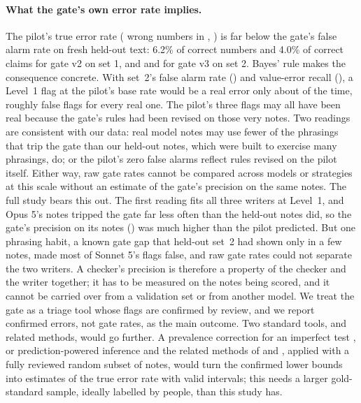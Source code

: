 \documentclass[11pt]{article}
\begin{document}
\paragraph{What the gate's own error rate implies.} The pilot's true error rate (\SoneUnsupN{} wrong numbers in \NChecked{}, \PilotBaseRate{}) is far below the gate's false alarm rate on fresh held-out text: 6.2\% of correct numbers and 4.0\% of correct claims for gate v2 on set 1, and \HeldTwoLoneFAPct{} and \HeldTwoLtwoFAPct{} for gate v3 on set 2. Bayes' rule makes the consequence concrete. With set~2's false alarm rate (\HeldTwoLoneFAPct{}) and value-error recall (\HeldTwoRecall{}), a Level~1 flag at the pilot's base rate would be a real error only about \ExpectedPrecision{} of the time, roughly \FalsePerReal{} false flags for every real one. The pilot's three flags may all have been real because the gate's rules had been revised on those very notes. Two readings are consistent with our data: real model notes may use fewer of the phrasings that trip the gate than our held-out notes, which were built to exercise many phrasings, do; or the pilot's zero false alarms reflect rules revised on the pilot itself. Either way, raw gate rates cannot be compared across models or strategies at this scale without an estimate of the gate's precision on the same notes. The full study bears this out. The first reading fits all three writers at Level~1, and Opus 5's notes tripped the gate far less often than the held-out notes did, so the gate's precision on its notes (\PrecOpus{}) was much higher than the pilot predicted. But one phrasing habit, a known gate gap that held-out set~2 had shown only in a few notes, made most of Sonnet 5's flags false, and raw gate rates could not separate the two writers. A checker's precision is therefore a property of the checker and the writer together; it has to be measured on the notes being scored, and it cannot be carried over from a validation set or from another model. We treat the gate as a triage tool whose flags are confirmed by review, and we report confirmed errors, not gate rates, as the main outcome. Two standard tools, and related methods, would go further. A prevalence correction for an imperfect test \citep{rogan1978estimating}, or prediction-powered inference \citep{angelopoulos2023ppi} and the related methods of \citet{deriu2023correction} and \citet{gligoric2025unconfident}, applied with a fully reviewed random subset of notes, would turn the confirmed lower bounds into estimates of the true error rate with valid intervals; this needs a larger gold-standard sample, ideally labelled by people, than this study has.
\end{document}
